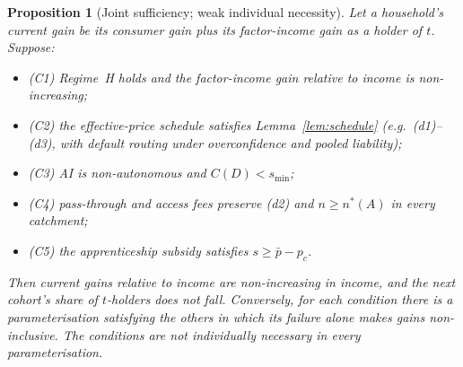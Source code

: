 \documentclass[12pt]{article}
\newtheorem{proposition}{Proposition}
\theoremstyle{remark}
\begin{document}
\begin{proposition}[Joint sufficiency; weak individual necessity]\label{prop:synthesis}
Let a household's current gain be its consumer gain plus its factor-income gain as a holder of $t$. Suppose:
\begin{itemize}[itemsep=0pt]
\item[] (C1) Regime~H holds and the factor-income gain relative to income is non-increasing;
\item[] (C2) the effective-price schedule satisfies Lemma~\ref{lem:schedule} (e.g.\ (d1)--(d3), with default routing under overconfidence and pooled liability);
\item[] (C3) AI is non-autonomous and $C(D)<s_{\min}$;
\item[] (C4) pass-through and access fees preserve (d2) and $n\ge n^*(A)$ in every catchment;
\item[] (C5) the apprenticeship subsidy satisfies $s\ge\bar p-p_c$.
\end{itemize}
Then current gains relative to income are non-increasing in income, and the next cohort's share of $t$-holders does not fall. Conversely, for each condition there is a parameterisation satisfying the others in which its failure alone makes gains non-inclusive. The conditions are not individually necessary in every parameterisation.
\end{proposition}
\end{document}
